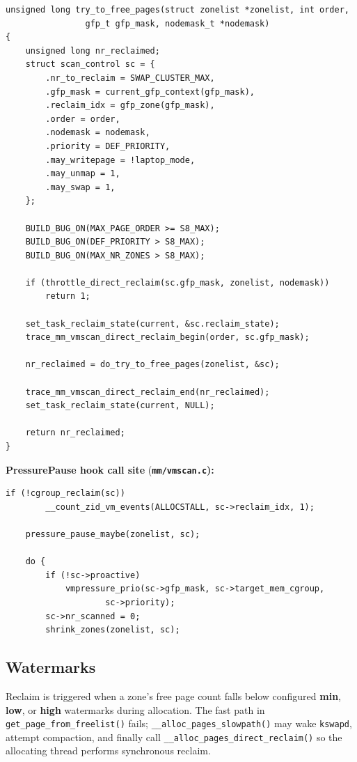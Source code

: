 \documentclass[12pt,a4paper]{article}
\newcommand{\srcfile}[1]{\begingroup\bfseries\color{aublue}\nolinkurl{#1}\endgroup}
\begin{document}
\begin{codebox}
\begin{lstlisting}[style=cstyle]
unsigned long try_to_free_pages(struct zonelist *zonelist, int order,
				gfp_t gfp_mask, nodemask_t *nodemask)
{
	unsigned long nr_reclaimed;
	struct scan_control sc = {
		.nr_to_reclaim = SWAP_CLUSTER_MAX,
		.gfp_mask = current_gfp_context(gfp_mask),
		.reclaim_idx = gfp_zone(gfp_mask),
		.order = order,
		.nodemask = nodemask,
		.priority = DEF_PRIORITY,
		.may_writepage = !laptop_mode,
		.may_unmap = 1,
		.may_swap = 1,
	};

	BUILD_BUG_ON(MAX_PAGE_ORDER >= S8_MAX);
	BUILD_BUG_ON(DEF_PRIORITY > S8_MAX);
	BUILD_BUG_ON(MAX_NR_ZONES > S8_MAX);

	if (throttle_direct_reclaim(sc.gfp_mask, zonelist, nodemask))
		return 1;

	set_task_reclaim_state(current, &sc.reclaim_state);
	trace_mm_vmscan_direct_reclaim_begin(order, sc.gfp_mask);

	nr_reclaimed = do_try_to_free_pages(zonelist, &sc);

	trace_mm_vmscan_direct_reclaim_end(nr_reclaimed);
	set_task_reclaim_state(current, NULL);

	return nr_reclaimed;
}
\end{lstlisting}
\end{codebox}

\noindent\textbf{PressurePause hook call site} (\srcfile{mm/vmscan.c}):

\begin{codebox}
\begin{lstlisting}[style=cstyle]
	if (!cgroup_reclaim(sc))
		__count_zid_vm_events(ALLOCSTALL, sc->reclaim_idx, 1);

	pressure_pause_maybe(zonelist, sc);

	do {
		if (!sc->proactive)
			vmpressure_prio(sc->gfp_mask, sc->target_mem_cgroup,
					sc->priority);
		sc->nr_scanned = 0;
		shrink_zones(zonelist, sc);
\end{lstlisting}
\end{codebox}

\subsection{Watermarks}

Reclaim is triggered when a zone's free page count falls below configured \textbf{min}, \textbf{low}, or \textbf{high} watermarks during allocation. The fast path in \texttt{get\_page\_from\_freelist()} fails; \texttt{\_\_alloc\_pages\_slowpath()} may wake \texttt{kswapd}, attempt compaction, and finally call \texttt{\_\_alloc\_pages\_direct\_reclaim()} so the allocating thread performs synchronous reclaim.
\end{document}
